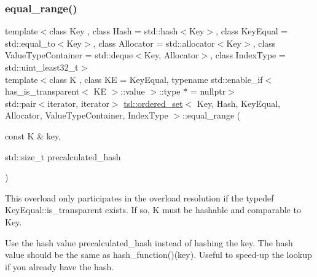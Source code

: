 \subsubsection{\texorpdfstring{equal\_range()}{equal\_range()}\hspace{0.1cm}{\footnotesize\ttfamily [4/6]}}
{\footnotesize\ttfamily template$<$class Key , class Hash  = std\+::hash$<$\+Key$>$, class Key\+Equal  = std\+::equal\+\_\+to$<$\+Key$>$, class Allocator  = std\+::allocator$<$\+Key$>$, class Value\+Type\+Container  = std\+::deque$<$\+Key, Allocator$>$, class Index\+Type  = std\+::uint\+\_\+least32\+\_\+t$>$ \\
template$<$class K , class KE  = Key\+Equal, typename std\+::enable\+\_\+if$<$ has\+\_\+is\+\_\+transparent$<$ K\+E $>$\+::value $>$\+::type $\ast$  = nullptr$>$ \\
std\+::pair$<$iterator, iterator$>$ \mbox{\hyperlink{classtsl_1_1ordered__set}{tsl\+::ordered\+\_\+set}}$<$ Key, Hash, Key\+Equal, Allocator, Value\+Type\+Container, Index\+Type $>$\+::equal\+\_\+range (\begin{DoxyParamCaption}\item[{const K \&}]{key,  }\item[{std\+::size\+\_\+t}]{precalculated\+\_\+hash }\end{DoxyParamCaption})\hspace{0.3cm}{\ttfamily [inline]}}





This overload only participates in the overload resolution if the typedef Key\+Equal\+::is\+\_\+transparent exists. If so, K must be hashable and comparable to Key.

Use the hash value \textquotesingle{}precalculated\+\_\+hash\textquotesingle{} instead of hashing the key. The hash value should be the same as hash\+\_\+function()(key). Useful to speed-\/up the lookup if you already have the hash. \mbox{\label{classtsl_1_1ordered__set_ada7f0385f77d78519f0eb6270cb70d62}} 
